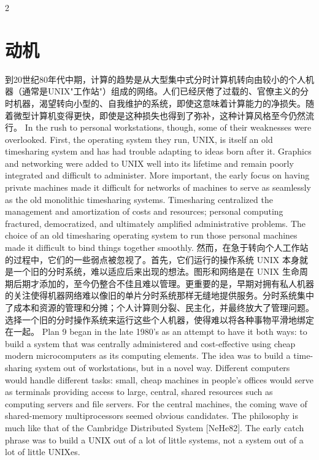 \documentclass{article}
\begin{document}
\begin{paracol}{2}
\section*{动机}
到20世纪80年代中期，计算的趋势是从大型集中式分时计算机转向由较小的个人机器（通常是UNIX"工作站"）组成的网络。人们已经厌倦了过载的、官僚主义的分时机器，渴望转向小型的、自我维护的系统，即使这意味着计算能力的净损失。随着微型计算机变得更快，即使是这种损失也得到了弥补，这种计算风格至今仍然流行。
\switchcolumn*
In the rush to personal workstations, though, some of their weaknesses were overlooked. First, the operating system they run, UNIX, is itself an old timesharing system and has had trouble adapting to ideas born after it. Graphics and networking were added to UNIX well into its lifetime and remain poorly integrated and difficult to administer. More important, the early focus on having private machines made it difficult for networks of machines to serve as seamlessly as the old monolithic timesharing systems. Timesharing centralized the management and amortization of costs and resources; personal computing fractured, democratized, and ultimately amplified administrative problems. The choice of an old timesharing operating system to run those personal machines made it difficult to bind things together smoothly.
\switchcolumn
然而，在急于转向个人工作站的过程中，它们的一些弱点被忽视了。首先，它们运行的操作系统 UNIX 本身就是一个旧的分时系统，难以适应后来出现的想法。图形和网络是在 UNIX 生命周期后期才添加的，至今仍整合不佳且难以管理。更重要的是，早期对拥有私人机器的关注使得机器网络难以像旧的单片分时系统那样无缝地提供服务。分时系统集中了成本和资源的管理和分摊；个人计算则分裂、民主化，并最终放大了管理问题。选择一个旧的分时操作系统来运行这些个人机器，使得难以将各种事物平滑地绑定在一起。
\switchcolumn*
Plan 9 began in the late 1980's as an attempt to have it both ways: to build a system that was centrally administered and cost-effective using cheap modern microcomputers as its computing elements. The idea was to build a time-sharing system out of workstations, but in a novel way. Different computers would handle different tasks: small, cheap machines in people's offices would serve as terminals providing access to large, central, shared resources such as computing servers and file servers. For the central machines, the coming wave of shared-memory multiprocessors seemed obvious candidates. The philosophy is much like that of the Cambridge Distributed System [NeHe82]. The early catch phrase was to build a UNIX out of a lot of little systems, not a system out of a lot of little UNIXes.
\switchcolumn

\end{paracol}
\end{document}
